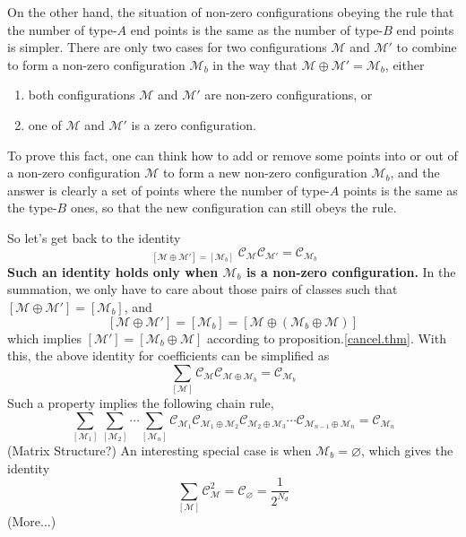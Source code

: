 \documentclass[12font]{article}
\theoremstyle{definition}
\numberwithin{equation}{section}
\newcommand{\alert}[1]{{\color{red}#1}}
\begin{document}
\alert{
On the other hand, the situation of non-zero configurations obeying the rule that the number of type-$A$ end points is the same as the number of type-$B$ end points is simpler. There are only two cases for two configurations $\mathcal{M}$ and $\mathcal{M}'$ to combine to form a non-zero configuration $\mathcal{M}_b$ in the way that $\mathcal{M}\oplus\mathcal{M}' = \mathcal{M}_b$, either
\begin{enumerate}
  \item [(i)] both configurations $\mathcal{M}$ and $\mathcal{M}'$ are non-zero configurations, or
  \item [(ii)] one of $\mathcal{M}$ and $\mathcal{M}'$ is a zero configuration.
\end{enumerate}
To prove this fact, one can think how to add or remove some points into or out of a non-zero configuration $\mathcal{M}$ to form a new non-zero configuration $\mathcal{M}_b$, and the answer is clearly a set of points where the number of type-$A$ points is the same as the type-$B$ ones, so that the new configuration can still obeys the rule. 
}



So let's get back to the identity
\[
\mathop{\sum_{[\mathcal{M}],[\mathcal{M}']}}_{[\mathcal{M}\oplus\mathcal{M}'] = [\mathcal{M}_b]} \mathcal{C}_{\mathcal{M}}\mathcal{C}_{\mathcal{M}'} = \mathcal{C}_{\mathcal{M}_b}
\]
\alert{\textbf{Such an identity holds only when $\mathcal{M}_b$ is a non-zero configuration.}} In the summation, we only have to care about those pairs of classes such that $[\mathcal{M}\oplus\mathcal{M}'] = [\mathcal{M}_b]$, and 
\[[\mathcal{M}\oplus\mathcal{M}'] = [\mathcal{M}_b] = [\mathcal{M}\oplus(\mathcal{M}_b\oplus\mathcal{M})]\]
which implies $[\mathcal{M}'] = [\mathcal{M}_b\oplus\mathcal{M}]$ according to proposition.\ref{cancel.thm}. With this, the above identity for coefficients can be simplified as
\begin{equation}\label{CoeIdentity.e}
  \sum_{[\mathcal{M}]} \mathcal{C}_{\mathcal{M}} \mathcal{C}_{\mathcal{M}\oplus\mathcal{M}_b}
  =
  \mathcal{C}_{\mathcal{M}_b}
\end{equation}
Such a property implies the following chain rule,
\begin{equation}\label{ChainRule.e}
  \sum_{[\mathcal{M}_1]}\sum_{[\mathcal{M}_2]}\cdots \sum_{[\mathcal{M}_n]}\mathcal{C}_{\mathcal{M}_1} \mathcal{C}_{\mathcal{M}_1\oplus\mathcal{M}_2} \mathcal{C}_{\mathcal{M}_2\oplus\mathcal{M}_3}\cdots \mathcal{C}_{\mathcal{M}_{n-1}\oplus\mathcal{M}_{n}} = \mathcal{C}_{\mathcal{M}_n}
\end{equation}
\alert{(Matrix Structure?)} An interesting special case is when $\mathcal{M}_b=\varnothing$, which gives the identity
\begin{equation}\label{SquareIdentity.e}
  \sum_{[\mathcal{M}]}\mathcal{C}_{\mathcal{M}}^2 = \mathcal{C}_{\varnothing} = \frac{1}{2^{N_d}}
\end{equation}
\alert{(More...)}
\end{document}
